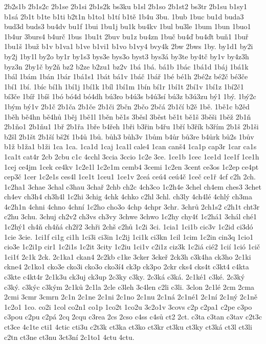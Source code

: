 {2b2s1b
2b1s2c
2b1se
2b1si
2b1s2k
bs3ku
b1sl
2b1so
2b1st2
bs3tr
2b1su
b1sy1
b1sá
2b1t
b1te
b1ti
b2t1n
b1to1
b1tí
b1tě
1b4u
3bu.
1bub
1buc
bu1d
buda3
bud3d
buds3
bu4dv
bu1f
1bui
1bu1j
bu1k
bu4kv
1bul
bu3le
1bum
1bun
1buo1
1b4ur
3burs4
b4urč
1bus
1bu1t
2buv
bu1z
bu4zn
1buč
bu4ď
bu4ďt
buň1
1buř
1bu1š
1buž
b1v
b1va1
b1ve
b1vi1
b1vo
b1vy4
bvy4k
2bw
2bws
1by.
by1d1
by2i
by2j
1by1l
by2o
by1r
by1s3
bys3e
bys3o
byst3
bys3á
by3te
by4tč
by1v
by4z3h
byz3n
2by1č
by2ň
bz2
b2ze
b2zu1
bz2v
1bá
1bá.
bá1b
1bác
1bá1d
1báj
1bá1k
1bál
1bám
1bán
1bár
1bá1s1
1bát
bá1v
1báč
1bář
1bé
bé1h
2bé2z
bé2č
bé3če
1bí1
1bí.
1bíc
bí1h
1bí1j
1bí1k
1bíl
1bí1m
1bín
bí1r
1bí1t
2bí1v
1bí1z
1bí2č1
bí3če
1bíř
1bíš
1bó
bó4d
bó4dh
bú3ro
b4ú3s
b4ú3sí
bú3z
b3ú3zu
bý1
1bý.
1bý2c
1bým
bý1v
2b1č
2b1ča
2b1če
2b1či
2bčn
2bčo
2bčá
2b1čí
b2ě
1bě.
1bě1c
b2ěd
1běh
bě4hn
bě4hů
1běj
1bě1l
1běn
bě1s
3běsl
3běst
bě1t
bě1š
3běši
1běž
2b1ň
2b1ňo1
2b1ňu1
1bř
2b1řa
1bře
b4řeh
1bři
b3řin
b4řu
1bří
b3řík
b3řím
2b1š
2b1ši
b2šl
2b1št
2b1ší
bš2ť
1b4ů
1bů.
bůh3
bůh3v
1bům
b4ůr
bů3re
b4ůrk
bů2s
1bův
b1ž
b1ža1
b1ži
1ca
1ca.
1ca1d
1caj
1ca1l
cale4
1can
canš4
1ca1p
cap3r
1car
ca1s
1ca1t
cat4r
2cb
2cbu
c1c
4cchl
3ccia
3ccio
1c2e
3ce.
1ce1b
1cec
1ce1d
1ce1f
1ce1h
1cej
ce4jm
1cek
ce4kv
1c2e1l
1c2e1m
cemb4
3cemi
1c2en
3cent
ce3os
1c2ep
ce4pt
cep3č
1cer
1c2e1s
ces4l
1ce1t
1ceu1
1ce1v
2ceá
ceú4
ceú4č
1ceč
ce1ř
4cf
c2h
2ch.
1c2ha1
3chae
3chal
c3hau
3chař
2chb
ch2c
4ch3co
1c2h4e
3chel
ch4em
ches3
3chet
ch4ev
ch3h4
ch3h4l
1c2hi
3chig
4chk
4chko
c2hl
3chl.
ch3ly
4ch4lé
4chlý
ch3ma
4c2h1n
4chni
4chno
4chní
1c2ho
cho3o
4chp
4chpr
3chr.
3chrů
2ch1s2
c2h1t
cht3r
c2hu
3chu.
3chuj
ch2v2
ch3vs
ch3vy
3chwe
3chwo
1c2hy
chy4ť
1c2há1
3chál
ché1
1c2hý1
ch4ň
ch4ňá
ch2ř2
3chři
2chš
c2hů
1c2i
3ci.
1cia1
1ci1b
cic3v
1c2id
ci3dó
1cie
3cie.
1ci1f
ci1g
ci1h
1ci3i
ci3in
1c2ij
1ci1k
ci3kn
1cil
1cim
1c2in
cin3q
1cio1
cio3e
1c2i1p
cir1
1c2i1s
1c2it
3city
1c2iu
1ci1v
c2i1z
ciz3k
1c2iá
cié2
1cií
1ció
1cič
1ci1ť
2c1k
2ck.
2c1ka1
ckan4
2c2kb
c1ke
3cker
3ckeř
2ck3h
c3k4ha
ck3ho
2c1ki
ckne4
2c1ko1
cko3e
cko3i
cko3o
cko3í4
ck3p
ck3po
2ckr
cks4
cks4t
c3kt4
c4kta
c3kte
c4kt4r
2c1k3u
ck3uj
ck3up
2c3ky
c3ky.
2c3ká
c3ká.
2c1ké1
c3ké.
2c3ký
c3ký.
c3kýc
c3kým
2c1ků
2c1la
2cle
c3leh
3c4len
c2li
c3li.
3clon
2c1lé
2cm
2cma
2cmi
3cmr
3cmrn
2c1n
2c1ne
2c1ni
2c1no
2c1nu
2c1ná
2c1né1
2c1ní
2c1ný
2c1ně
1c2o1
1co.
co2i
1col
co2n1
co1p
1co2t
1co2u
3c2o1v
3covs
c2p
c2pa1
c2pe
c3po
c3pou
c2pu
c2pá
2cq
2cqu
c3rea
2cs
2cso
c4ss
c4sů
ct2
2ct.
c3ta
c3tan
c3tav
c2t3c
ct3ce
4c1te
cti1
4ctic
cti3u
c2t3k
ct3ka
ct3ko
ct3kr
ct3ku
ct3ky
ct3ká
ct3l
ct3li
c2tn
ct3ne
ct3nu
3ct3ní
2c1to1
4ctu
4ctu.
}
